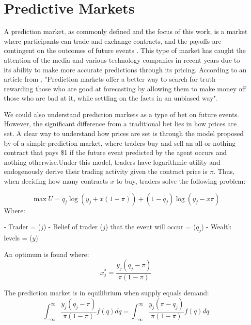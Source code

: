 \section{Predictive Markets}
\label{sec:predictive_markets}

A prediction market, as commonly defined and the focus of this work, is a market where participants can trade and exchange contracts, and the payoffs are contingent on the outcomes of future events \parencite{wolfers2004prediction}. This type of market has caught the attention of the media and various technology companies in recent years due to its ability to make more accurate predictions through its pricing. According to an article from \textcite{roose2022wager}, "Prediction markets offer a better way to search for truth — rewarding those who are good at forecasting by allowing them to make money off those who are bad at it, while settling on the facts in an unbiased way".

We could also understand prediction markets as a type of bet on future events. However, the significant difference from a traditional bet lies in how prices are set. A clear way to understand how prices are set is through the model proposed by  \textcite{wolfers2004prediction}  of a simple prediction market, where traders buy and sell an all-or-nothing contract that pays  \$1 if the future event predicted by the agent occurs and nothing otherwise.Under this model, traders have logarithmic utility and endogenously derive their trading activity given the contract price is \( \pi \). Thus, when deciding how many contracts \( x \) to buy, traders solve the following problem:

\begin{equation}
    \max U = q_j \log(y_j + x(1 - \pi)) + (1 - q_j) \log(y_j - x\pi)
\end{equation}
Where:

- Trader = (\( j \))
- Belief of trader (\( j \)) that the event will occur = (\( q_j \))
- Wealth levels = (\( y \))

An optimum is found where:
\begin{equation}
    x_j^* = \frac{y_j(q_j - \pi)}{\pi(1 - \pi)}
\end{equation}

The prediction market is in equilibrium when supply equals demand:
\begin{equation}
    \int_{-\infty}^{\infty}\frac{y_j(q_j - \pi)}{\pi(1 - \pi)}f(q)dq = \int_{-\infty}^{\infty}\frac{y_j(\pi -q_j)}{\pi(1 - \pi)}f(q)dq
\end{equation}

